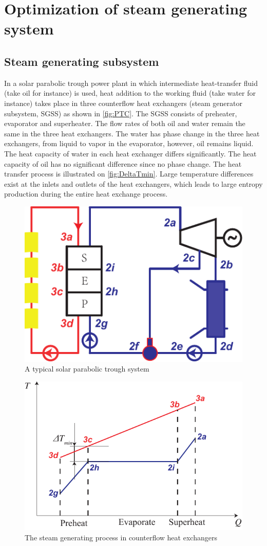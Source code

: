 \chapter{Optimization of steam generating system}
\label{cha:osgs}
\section{Steam generating subsystem}

In a solar parabolic trough power plant in which intermediate heat-transfer fluid (take oil for instance) is used, heat addition to the working fluid (take water for instance) takes place in three counterflow heat exchangers (steam generator subsystem, SGSS) as shown in \autoref{fig:PTC}. The SGSS consists of preheater, evaporator and superheater. The flow rates of both oil and water remain the same in the three heat exchangers. 
The water has phase change in the three heat exchangers, from liquid to vapor in the evaporator, however, oil remains liquid. The heat capacity of water in each heat exchanger  differs significantly. The heat capacity of oil has no significant difference since no phase change. The heat transfer process is illustrated on \autoref{fig:DeltaTmin}. Large temperature differences exist at the inlets and outlets of the heat exchangers, which leads to large entropy production during the entire heat exchange process.

\begin{figure}[htbp]
\centering
	\includegraphics[width = 0.4\columnwidth]{fig/PTC}
	\caption{A typical solar parabolic trough system}
	\label{fig:PTC}
\end{figure}
\begin{figure}[htbp]
\centering
	\includegraphics[width = 0.5\columnwidth]{fig/DeltaTmin}
	\caption{The steam generating process in counterflow heat exchangers}
	\label{fig:DeltaTmin}
\end{figure}

